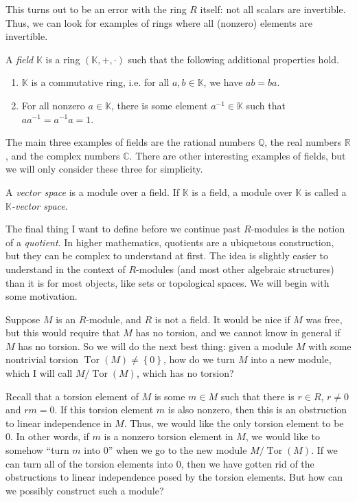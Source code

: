 This turns out to be an error with the ring $R$ itself: not all scalars are invertible. Thus, we can look for examples of rings where all (nonzero) elements are invertible.

\begin{definition}\label{dfn:field}
	A \emph{field} $\mathbb{K} $ is a ring $(\mathbb{K} ,+,\cdot )$ such that the following additional properties hold.
	\begin{enumerate}
		\item $\mathbb{K} $ is a commutative ring, i.e. for all $a,b\in\mathbb{K} $, we have $ab=ba$.
		\item For all nonzero $a\in\mathbb{K} $, there is some element $a^{-1} \in\mathbb{K} $ such that $a a^{-1} =a^{-1} a=1$.
	\end{enumerate}
\end{definition}

The main three examples of fields are the rational numbers $\mathbb{Q} $, the real numbers $\mathbb{R} $, and the complex numbers $\mathbb{C} $. There are other interesting examples of fields, but we will only consider these three for simplicity.

\begin{definition}\label{dfn:vector-space}
	A \emph{vector space} is a module over a field. If $\mathbb{K} $ is a field, a module over $\mathbb{K} $ is called a \emph{$\mathbb{K} $-vector space}.
\end{definition}

The final thing I want to define before we continue past $R$-modules is the notion of a \emph{quotient}. In higher mathematics, quotients are a ubiquetous construction, but they can be complex to understand at first. The idea is slightly easier to understand in the context of $R$-modules (and most other algebraic structures) than it is for most objects, like sets or topological spaces. We will begin with some motivation.

Suppose $M$ is an $R$-module, and $R$ is not a field. It would be nice if $M$ was free, but this would require that $M$ has no torsion, and we cannot know in general if $M$ has no torsion. So we will do the next best thing: given a module $M$ with some nontrivial torsion $\operatorname{Tor} (M) \neq \left\{ 0 \right\} $, how do we turn $M$ into a new module, which I will call $M / \operatorname{Tor} (M)$, which has no torsion?

Recall that a torsion element of $M$ is some $m\in M$ such that there is $r\in R$, $r\neq 0$ and $r m=0$. If this torsion element $m$ is also nonzero, then this is an obstruction to linear independence in $M$. Thus, we would like the only torsion element to be 0. In other words, if $m$ is a nonzero torsion element in $M$, we would like to somehow ``turn $m$ into 0'' when we go to the new module $M / \operatorname{Tor} (M)$. If we can turn all of the torsion elements into 0, then we have gotten rid of the obstructions to linear independence posed by the torsion elements. But how can we possibly construct such a module?

